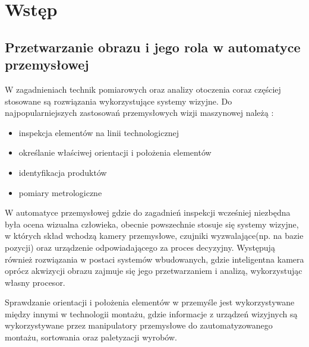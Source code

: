\documentclass[document.tex]{subfiles}
\begin{document}
\chapter{Wstęp}

\section{Przetwarzanie obrazu i jego rola w automatyce przemysłowej}
	\indent W zagadnieniach technik pomiarowych oraz analizy otoczenia coraz częściej stosowane
	są rozwiązania wykorzystujące systemy wizyjne. Do najpopularniejszych zastosowań przemysłowych wizji maszynowej należą \cite{Machine_Vision_Intro}:
	\begin{itemize}
		\item inspekcja elementów na linii technologicznej
		\item określanie właściwej orientacji i położenia elementów
		\item identyfikacja produktów
		\item pomiary metrologiczne		
	\end{itemize}
	\indent W automatyce przemysłowej gdzie do zagadnień inspekcji
	wcześniej niezbędna była ocena wizualna człowieka, obecnie powszechnie stosuje się systemy wizyjne, 
	w których skład wchodzą kamery przemysłowe, czujniki wyzwalające(np. na bazie pozycji) oraz urządzenie odpowiadającego za proces decyzyjny.
	Występują również rozwiązania w postaci systemów wbudowanych, gdzie inteligentna kamera oprócz
	akwizycji obrazu zajmuje się jego przetwarzaniem i analizą, wykorzystując własny procesor.\cite{Machine_Vision_Intro}\cite{Davies_Machine_Vision}
	


	\indent Sprawdzanie orientacji i położenia elementów w przemyśle jest wykorzystywane
	między innymi w technologii montażu, gdzie informacje z urządzeń wizyjnych są wykorzystywane
	przez manipulatory przemysłowe do zautomatyzowanego montażu, sortowania oraz paletyzacji wyrobów.\cite{Machine_Vision_Intro}

\end{document}
